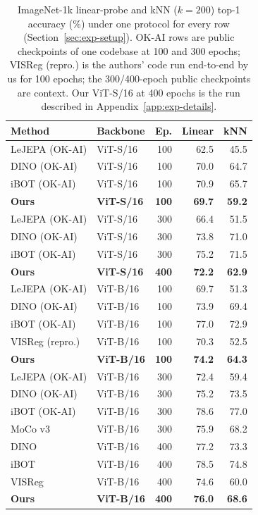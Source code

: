\begin{table}[h]
\centering
\small
\begin{tabular}{llrrr}
\toprule
Method & Backbone & Ep. & Linear & kNN \\
\midrule
LeJEPA (OK-AI) & ViT-S/16 & 100 & 62.5 & 45.5 \\
DINO (OK-AI) & ViT-S/16 & 100 & 70.0 & 64.7 \\
iBOT (OK-AI) & ViT-S/16 & 100 & 70.9 & 65.7 \\
\textbf{Ours} & \textbf{ViT-S/16} & \textbf{100} & \textbf{69.7} & \textbf{59.2} \\
\midrule
LeJEPA (OK-AI) & ViT-S/16 & 300 & 66.4 & 51.5 \\
DINO (OK-AI) & ViT-S/16 & 300 & 73.8 & 71.0 \\
iBOT (OK-AI) & ViT-S/16 & 300 & 75.2 & 71.5 \\
\textbf{Ours} & \textbf{ViT-S/16} & \textbf{400} & \textbf{72.2} & \textbf{62.9} \\
\midrule
LeJEPA (OK-AI) & ViT-B/16 & 100 & 69.7 & 51.3 \\
DINO (OK-AI) & ViT-B/16 & 100 & 73.9 & 69.4 \\
iBOT (OK-AI) & ViT-B/16 & 100 & 77.0 & 72.9 \\
VISReg (repro.) & ViT-B/16 & 100 & 70.3 & 52.5 \\
\textbf{Ours} & \textbf{ViT-B/16} & \textbf{100} & \textbf{74.2} & \textbf{64.3} \\
\midrule
LeJEPA (OK-AI) & ViT-B/16 & 300 & 72.4 & 59.4 \\
DINO (OK-AI) & ViT-B/16 & 300 & 75.2 & 73.5 \\
iBOT (OK-AI) & ViT-B/16 & 300 & 78.6 & 77.0 \\
MoCo v3 & ViT-B/16 & 300 & 75.9 & 68.2 \\
DINO & ViT-B/16 & 400 & 77.2 & 73.3 \\
iBOT & ViT-B/16 & 400 & 78.5 & 74.8 \\
VISReg & ViT-B/16 & 400 & 74.6 & 60.0 \\
\textbf{Ours} & \textbf{ViT-B/16} & \textbf{400} & \textbf{76.0} & \textbf{68.6} \\
\bottomrule
\end{tabular}
\caption{ImageNet-1k linear-probe and kNN ($k{=}200$) top-1 accuracy (\%) under one protocol for every row (Section~\ref{sec:exp-setup}). OK-AI rows are public checkpoints of one codebase at 100 and 300 epochs; VISReg (repro.) is the authors' code run end-to-end by us for 100 epochs; the 300/400-epoch public checkpoints are context. Our ViT-S/16 at 400 epochs is the run described in Appendix~\ref{app:exp-details}.}
\label{tab:in1k-main}
\end{table}

